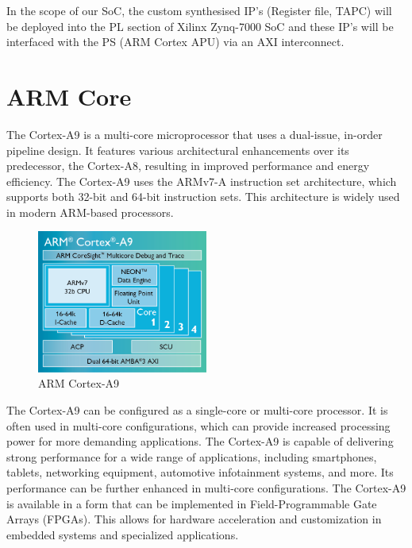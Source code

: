 \vspace{2mm}
In the scope of our SoC, the custom synthesised IP’s (Register file, TAPC) will be deployed into the PL section of Xilinx Zynq-7000 SoC and these IP’s will be interfaced with the PS (ARM Cortex APU) via an AXI interconnect.

\section{ARM Core}
The Cortex-A9 is a multi-core microprocessor that uses a dual-issue, in-order pipeline design. It features various architectural enhancements over its predecessor, the Cortex-A8, resulting in improved performance and energy efficiency. The Cortex-A9 uses the ARMv7-A instruction set architecture, which supports both 32-bit and 64-bit instruction sets. This architecture is widely used in modern ARM-based processors. 

\begin{figure}[h] %
  \centering
  \setlength{\abovecaptionskip}{0pt} %
  \setlength{\belowcaptionskip}{0pt} %
  \includegraphics[width=0.5\textwidth]{Image/ARM core.png} %
  \caption{ARM Cortex-A9}
  \label{Figure 1 : ARM Cortex-A9}
\end{figure}


The Cortex-A9 can be configured as a single-core or multi-core processor. It is often used in multi-core configurations, which can provide increased processing power for more demanding applications. The Cortex-A9 is capable of delivering strong performance for a wide range of applications, including smartphones, tablets, networking equipment, automotive infotainment systems, and more. Its performance can be further enhanced in multi-core
configurations. The Cortex-A9 is available in a form that can be implemented in Field-Programmable Gate Arrays (FPGAs). This allows for hardware acceleration and customization in embedded systems and specialized applications.